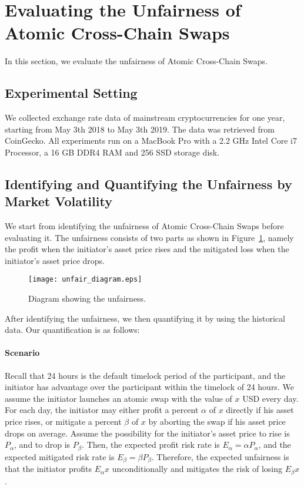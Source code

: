 \section{Evaluating the Unfairness of Atomic Cross-Chain Swaps}
\label{sec:evaluation}

In this section, we evaluate the unfairness of Atomic Cross-Chain Swaps.

\subsection{Experimental Setting}

We collected exchange rate data of mainstream cryptocurrencies for one year, starting from May 3th 2018 to May 3th 2019.
The data was retrieved from CoinGecko.
All experiments run on a MacBook Pro with a 2.2 GHz Intel Core i7 Processor, a 16 GB DDR4 RAM and 256 SSD storage disk.

\subsection{Identifying and Quantifying the Unfairness by Market Volatility}

We start from identifying the unfairness of Atomic Cross-Chain Swaps before evaluating it.
The unfairness consists of two parts as shown in Figure~\ref{fig:unfair_diagram}, namely the profit when the initiator's asset price rises and the mitigated loss when the initiator's asset price drops.

\begin{figure}
    \texttt{[image: unfair\_diagram.eps]}
    \caption{Diagram showing the unfairness.} %
    \label{fig:unfair_diagram}
\end{figure}

After identifying the unfairness, we then quantifying it by using the historical data.
Our quantification is as follows:

\paragraph{Scenario}
Recall that 24 hours is the default timelock period of the participant,
and the initiator has advantage over the participant within the timelock of 24 hours.
We assume the initiator launches an atomic swap with the value of $x$ USD every day.
For each day, the initiator may either profit a percent $\alpha$ of $x$ directly if his asset price rises,
or mitigate a percent $\beta$ of $x$ by aborting the swap if his asset price drops on average.
Assume the possibility for the initiator's asset price to rise is $P_{\alpha}$, and to drop is $P_{\beta}$.
Then, the expected profit risk rate is $E_{\alpha} = \alpha P_{\alpha}$,
and the expected mitigated risk rate is $E_{\beta} = \beta P_{\beta}$.
Therefore, the expected unfairness is that the initiator profits $E_{\alpha} x$ unconditionally and mitigates the risk of losing $E_{\beta} x$.

